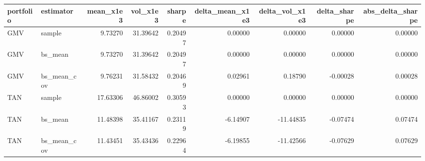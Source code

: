 \begin{tabular}{llrrrrrrr}
\toprule
portfolio & estimator & mean\_x1e3 & vol\_x1e3 & sharpe & delta\_mean\_x1e3 & delta\_vol\_x1e3 & delta\_sharpe & abs\_delta\_sharpe \\
\midrule
GMV & sample & 9.73270 & 31.39642 & 0.20497 & 0.00000 & 0.00000 & 0.00000 & 0.00000 \\
GMV & bs\_mean & 9.73270 & 31.39642 & 0.20497 & 0.00000 & 0.00000 & 0.00000 & 0.00000 \\
GMV & bs\_mean\_cov & 9.76231 & 31.58432 & 0.20469 & 0.02961 & 0.18790 & -0.00028 & 0.00028 \\
TAN & sample & 17.63306 & 46.86002 & 0.30593 & 0.00000 & 0.00000 & 0.00000 & 0.00000 \\
TAN & bs\_mean & 11.48398 & 35.41167 & 0.23119 & -6.14907 & -11.44835 & -0.07474 & 0.07474 \\
TAN & bs\_mean\_cov & 11.43451 & 35.43436 & 0.22964 & -6.19855 & -11.42566 & -0.07629 & 0.07629 \\
\bottomrule
\end{tabular}
